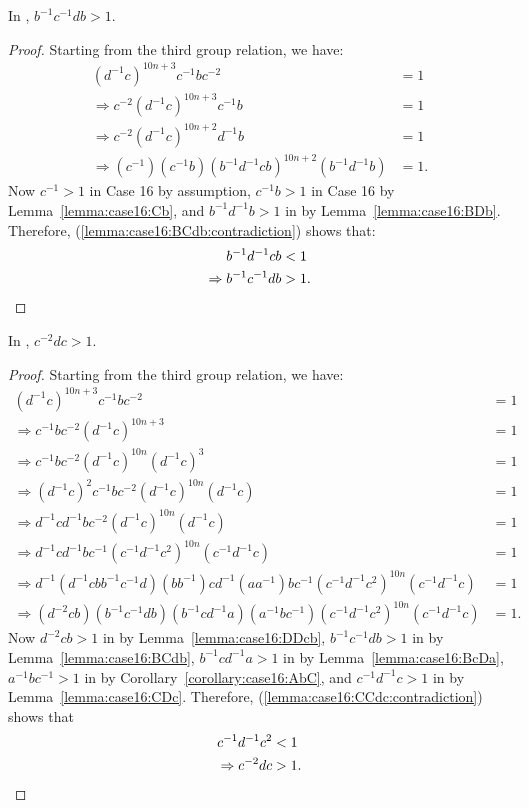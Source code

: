 \begin{lemma} In , $b^{-1}c^{-1}db>1$.
\label{lemma:case16:BCdb}
\end{lemma}
\begin{proof} Starting from the third group relation, we have:
\begin{align}
(d^{-1}c)^{10n+3}c^{-1}bc^{-2}&=1\nonumber{}\\
\Rightarrow{}c^{-2}(d^{-1}c)^{10n+3}c^{-1}b&=1\nonumber{}\\
\Rightarrow{}c^{-2}(d^{-1}c)^{10n+2}d^{-1}b&=1\nonumber{}\\
\Rightarrow{}(c^{-1})(c^{-1}b)(b^{-1}d^{-1}cb)^{10n+2}(b^{-1}d^{-1}b)&=1.\label{lemma:case16:BCdb:contradiction}
\end{align}
Now $c^{-1}>1$ in Case 16 by assumption, $c^{-1}b>1$ in Case 16 by Lemma~\ref{lemma:case16:Cb}, and $b^{-1}d^{-1}b>1$ in  by Lemma~\ref{lemma:case16:BDb}. Therefore, (\ref{lemma:case16:BCdb:contradiction}) shows that:
\begin{align*}
b^{-1}d^{-1}cb&<1\\
\Rightarrow{}b^{-1}c^{-1}db&>1.\qedhere
\end{align*}
\end{proof}

\begin{lemma} In , $c^{-2}dc>1$.
\label{lemma:case16:CCdc}
\end{lemma}
\begin{proof}
Starting from the third group relation, we have:
\begin{align}
(d^{-1}c)^{10n+3}c^{-1}bc^{-2}&=1\nonumber{}\\
\Rightarrow{}c^{-1}bc^{-2}(d^{-1}c)^{10n+3}&=1\nonumber{}\\
\Rightarrow{}c^{-1}bc^{-2}(d^{-1}c)^{10n}(d^{-1}c)^{3}&=1\nonumber{}\\
\Rightarrow{}(d^{-1}c)^{2}c^{-1}bc^{-2}(d^{-1}c)^{10n}(d^{-1}c)&=1\nonumber{}\\
\Rightarrow{}d^{-1}cd^{-1}bc^{-2}(d^{-1}c)^{10n}(d^{-1}c)&=1\nonumber{}\\
\Rightarrow{}d^{-1}cd^{-1}bc^{-1}(c^{-1}d^{-1}c^{2})^{10n}(c^{-1}d^{-1}c)&=1\nonumber{}\\
\Rightarrow{}d^{-1}(d^{-1}cbb^{-1}c^{-1}d)(bb^{-1})cd^{-1}(aa^{-1})bc^{-1}(c^{-1}d^{-1}c^{2})^{10n}(c^{-1}d^{-1}c)&=1\nonumber{}\\
\Rightarrow{}(d^{-2}cb)(b^{-1}c^{-1}db)(b^{-1}cd^{-1}a)(a^{-1}bc^{-1})(c^{-1}d^{-1}c^{2})^{10n}(c^{-1}d^{-1}c)&=1.\label{lemma:case16:CCdc:contradiction}
\end{align}
Now $d^{-2}cb>1$ in  by Lemma~\ref{lemma:case16:DDcb}, $b^{-1}c^{-1}db>1$ in  by Lemma~\ref{lemma:case16:BCdb}, $b^{-1}cd^{-1}a>1$ in  by Lemma~\ref{lemma:case16:BcDa}, $a^{-1}bc^{-1}>1$ in  by Corollary~\ref{corollary:case16:AbC}, and $c^{-1}d^{-1}c>1$ in  by Lemma~\ref{lemma:case16:CDc}. Therefore, (\ref{lemma:case16:CCdc:contradiction}) shows that
\begin{align*}
c^{-1}d^{-1}c^{2}&<1\\
\Rightarrow{}c^{-2}dc&>1.\qedhere
\end{align*}
\end{proof}

